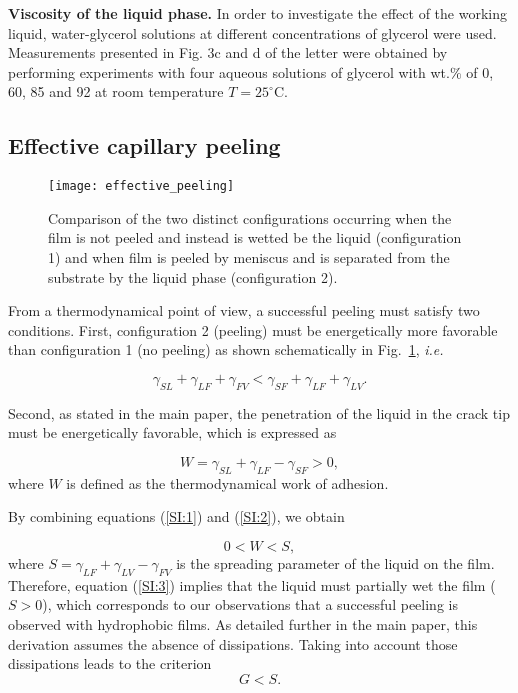 \documentclass[10pt,twocolumn]{article}
\begin{document}
{\bf {Viscosity of the liquid phase.}} In order to investigate the effect of the working liquid,  water-glycerol solutions at different concentrations of glycerol were used.  Measurements presented in Fig. 3c and d of the letter were obtained by performing experiments with four aqueous solutions of glycerol with wt.$\%$ of 0, 60, 85 and 92 at room temperature $T = 25^{\circ }$C.



\subsection{Effective capillary peeling}

\begin{figure}[ht]
 \center
 \texttt{[image: effective\_peeling]}%
 \caption{Comparison of the two distinct configurations occurring when the film is not peeled and instead is wetted be the liquid (configuration 1) and when film is peeled by meniscus and is separated from the substrate by the liquid phase (configuration 2).}
 \label{fig:effective_peeling}
 \end{figure}

From a thermodynamical point of view, a successful peeling must satisfy two conditions.
First, configuration 2 (peeling) must be energetically more favorable than configuration 1 (no peeling) as shown schematically in Fig.~\ref{fig:effective_peeling}, \textit{i.e.}

\begin{equation}\label{SI:1}
\gamma_{SL} + \gamma_{LF} + \gamma_{FV} <  \gamma_{SF} + \gamma_{LF} + \gamma_{LV}.
\end{equation}

Second, as stated in the main paper, the penetration of the liquid in the crack tip must be energetically favorable, which is expressed as

\begin{equation}\label{SI:2}
W = \gamma_{SL} + \gamma_{LF}  - \gamma_{SF} > 0,
\end{equation}
where $W$ is defined as the thermodynamical work of adhesion.

By combining equations (\ref{SI:1}) and (\ref{SI:2}), we obtain

\begin{equation}\label{SI:3}
0 < W < S,
\end{equation}
where $S = \gamma_{LF} + \gamma_{LV} - \gamma_{FV}$ is the spreading parameter of the liquid on the film.
Therefore, equation (\ref{SI:3}) implies that the liquid must partially wet the film ($S>0$), which corresponds to our observations that a successful peeling is observed with hydrophobic films.
As detailed further in the main paper, this derivation assumes the absence of dissipations.
Taking into account those dissipations leads to the criterion
\begin{equation}\label{SI:4}
G < S.
\end{equation}


        
\end{document}
